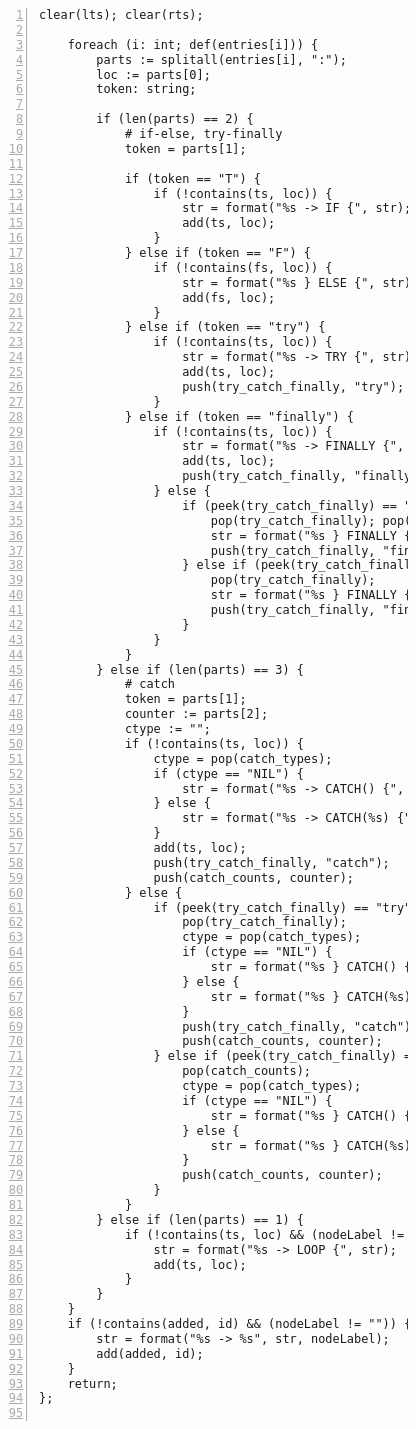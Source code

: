 \begin{figure}[ht!]
\begin{lstlisting}[numbers=left, tabsize=4, escapechar=@, caption={API Usage Mining Analysis},label={lst:aun-code}, lastline = 10]
	clear(lts); clear(rts);
		
	foreach (i: int; def(entries[i])) {
		parts := splitall(entries[i], ":");
		loc := parts[0];
		token: string;
		
		if (len(parts) == 2) {
			# if-else, try-finally
			token = parts[1];
				
			if (token == "T") {
				if (!contains(ts, loc)) {
					str = format("%s -> IF {", str);
					add(ts, loc);
				}
			} else if (token == "F") {
				if (!contains(fs, loc)) {
					str = format("%s } ELSE {", str);
					add(fs, loc); 
				}
			} else if (token == "try") {
				if (!contains(ts, loc)) {
					str = format("%s -> TRY {", str);
					add(ts, loc);
					push(try_catch_finally, "try");
				}
			} else if (token == "finally") {
				if (!contains(ts, loc)) {
					str = format("%s -> FINALLY {", str);
					add(ts, loc);
					push(try_catch_finally, "finally");
				} else {
					if (peek(try_catch_finally) == "catch") {
						pop(try_catch_finally); pop(catch_counts);
						str = format("%s } FINALLY {", str);
						push(try_catch_finally, "finally");
					} else if (peek(try_catch_finally) == "try") {
					    pop(try_catch_finally);
					    str = format("%s } FINALLY {", str);
					    push(try_catch_finally, "finally");
					}
				}
			} 
		} else if (len(parts) == 3) {
			# catch
			token = parts[1];
			counter := parts[2];
			ctype := "";
			if (!contains(ts, loc)) {
			    ctype = pop(catch_types);
			    if (ctype == "NIL") {
				    str = format("%s -> CATCH() {", str);
			    } else {
			        str = format("%s -> CATCH(%s) {", str, ctype);
			    }
				add(ts, loc);
				push(try_catch_finally, "catch");
				push(catch_counts, counter);
			} else {
				if (peek(try_catch_finally) == "try") {
					pop(try_catch_finally);
					ctype = pop(catch_types);
			        if (ctype == "NIL") {
			            str = format("%s } CATCH() {", str);    
			        } else {
			            str = format("%s } CATCH(%s) {", str, ctype);    
			        }
					push(try_catch_finally, "catch");
					push(catch_counts, counter);
				} else if (peek(try_catch_finally) == "catch" && peek(catch_counts) != counter) {
					pop(catch_counts);
					ctype = pop(catch_types);
			        if (ctype == "NIL") {
			            str = format("%s } CATCH() {", str);    
			        } else {
			            str = format("%s } CATCH(%s) {", str, ctype);    
			        }
					push(catch_counts, counter);
				}
			}
		} else if (len(parts) == 1) {
			if (!contains(ts, loc) && (nodeLabel != "")) {
				str = format("%s -> LOOP {", str);
				add(ts, loc);
			}
		} 
	}
	if (!contains(added, id) && (nodeLabel != "")) {
        str = format("%s -> %s", str, nodeLabel);
        add(added, id);
    }
	return;
};


\end{lstlisting}
\end{figure}
